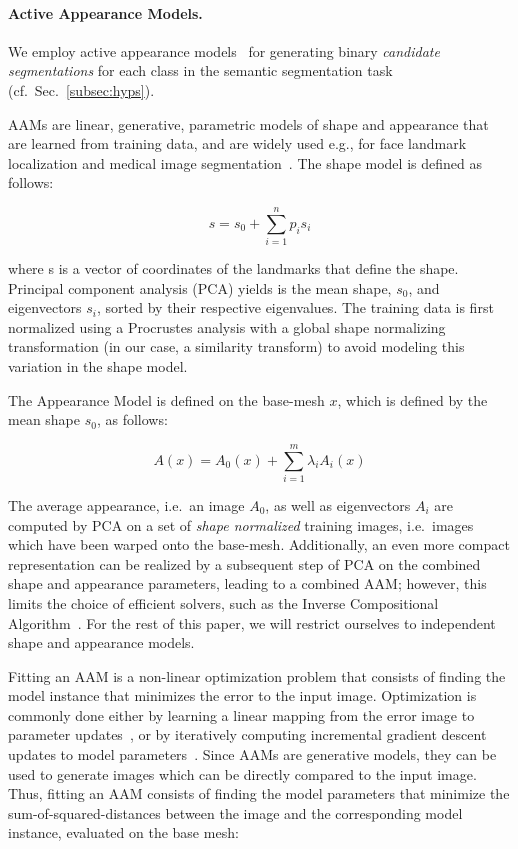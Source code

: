 \documentclass[10pt,twocolumn,letterpaper]{article}
\begin{document}
\paragraph{Active Appearance Models. }
We employ active appearance models~\cite{CootesAAM2001} for generating binary \emph{candidate segmentations} for each class in the semantic segmentation task (cf.\ Sec.\ \ref{subsec:hyps}). 

AAMs are linear, generative, parametric models of shape and appearance that are learned from training data, and are widely used e.g., for face landmark localization and medical image segmentation~\cite{Heimann2009543}. 
%
The shape model is defined as follows:

\[s = s_0 + \sum_{i=1}^n p_i s_i\]

where s is a vector of coordinates of the landmarks that define the shape.  Principal component analysis (PCA) yields is the mean shape, $s_0$, and eigenvectors $s_i$, sorted by their respective eigenvalues. The training data is first normalized using a Procrustes analysis with a global shape normalizing transformation (in our case, a similarity transform) to avoid modeling this variation in the shape model.

The Appearance Model is defined on the base-mesh  $x$, which is defined by the mean shape $s_0$, as follows:

\[A(x) = A_0(x) + \sum_{i=1}^m \lambda_i A_i(x)\]

The average appearance, i.e.\ an image $A_0$, as well as eigenvectors $A_i$ are computed by PCA on a set of \emph{shape normalized} training images, i.e.\ images which have been warped onto the base-mesh. 
Additionally, an even more compact representation can be realized by a subsequent step of PCA on the combined shape and appearance parameters, leading to a combined AAM; however, this limits the choice of efficient solvers, such as the Inverse Compositional Algorithm~\cite{BakerAAM2004}. 
For the rest of this paper, we will restrict ourselves to independent shape and appearance models.

Fitting an AAM is a non-linear optimization problem that consists of finding the model instance that minimizes the error to the input image. Optimization is commonly done either by learning a linear mapping from the error image to parameter updates~\cite{CootesAAM2001}, or by iteratively computing incremental gradient descent updates to model parameters~\cite{BakerAAM2004}. 
%
Since AAMs are generative models, they can be used to generate images which can be directly compared to the input image.  Thus, fitting an AAM consists of finding the model parameters that minimize the sum-of-squared-distances between the image and the corresponding model instance, evaluated on the base mesh:
\end{document}
